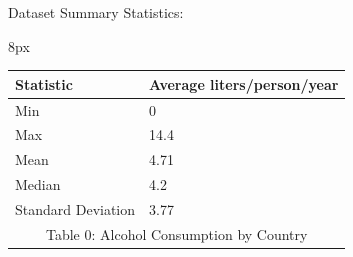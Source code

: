 \documentclass{article}
\begin{document}
Dataset Summary Statistics:

\begin{adjustwidth}{8px}{}
\centering
\begin{tabular}{|l|l|}
\hline
Statistic          & Average liters/person/year \\ \hline
Min                & 0                          \\ \hline
Max                & 14.4                       \\ \hline
Mean               & 4.71                       \\ \hline
Median             & 4.2                        \\ \hline
Standard Deviation & 3.77                       \\ \hline
\multicolumn{2}{c}{Table 0: Alcohol Consumption by Country} 
\label{summary-statistic-table-alcohol}
\end{tabular}
\end{adjustwidth}
\end{document}
